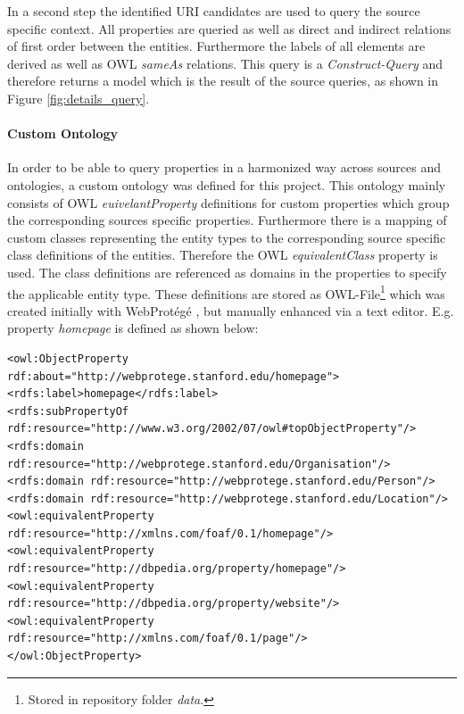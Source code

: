 In a second step the identified URI candidates are used to query the source specific context. All properties are queried as well as direct and indirect relations of first order between the entities. Furthermore the labels of all elements are derived as well as OWL \textit{sameAs} relations. 
This query is a \textit{Construct-Query} and therefore returns a model which is the result of the source queries, as shown in Figure \ref{fig:details_query}. 

\paragraph{Custom Ontology}
In order to be able to query properties in a harmonized way across sources and ontologies, a custom ontology was defined for this project. This  ontology mainly consists of OWL \textit{euivelantProperty} definitions for custom properties which group the corresponding sources specific properties. Furthermore there is a mapping of custom classes representing the entity types to the corresponding source specific class definitions of the entities. Therefore the OWL \textit{equivalentClass} property is used. The class definitions are referenced as domains in the properties to specify the applicable entity type. These definitions are stored as OWL-File\footnote{Stored in repository folder \textit{data}.} which was created initially with WebProtégé \cite{stanford_university_webprotege_2016}, but manually enhanced via a text editor. E.g. property \textit{homepage} is defined as shown below:


\tiny
\begin{lstlisting}
<owl:ObjectProperty rdf:about="http://webprotege.stanford.edu/homepage">
<rdfs:label>homepage</rdfs:label>
<rdfs:subPropertyOf rdf:resource="http://www.w3.org/2002/07/owl#topObjectProperty"/>
<rdfs:domain rdf:resource="http://webprotege.stanford.edu/Organisation"/>
<rdfs:domain rdf:resource="http://webprotege.stanford.edu/Person"/>
<rdfs:domain rdf:resource="http://webprotege.stanford.edu/Location"/>
<owl:equivalentProperty rdf:resource="http://xmlns.com/foaf/0.1/homepage"/>
<owl:equivalentProperty rdf:resource="http://dbpedia.org/property/homepage"/>
<owl:equivalentProperty rdf:resource="http://dbpedia.org/property/website"/>
<owl:equivalentProperty rdf:resource="http://xmlns.com/foaf/0.1/page"/>
</owl:ObjectProperty>
\end{lstlisting}
\normalsize



